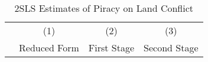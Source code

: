 \begin{table}[htbp]\centering
\def\sym#1{\ifmmode^{#1}\else\(^{#1}\)\fi}
\caption{2SLS Estimates of Piracy on Land Conflict  \label{TableMain2SLSReStudPanelwd2}}
\begin{tabular}{l*{3}{c}}
\toprule
                    &\multicolumn{1}{c}{(1)}   &\multicolumn{1}{c}{(2)}   &\multicolumn{1}{c}{(3)}   \\
                    &Reduced Form   & First Stage   &Second Stage   \\
\midrule
\bottomrule
\end{tabular}
\end{table}

